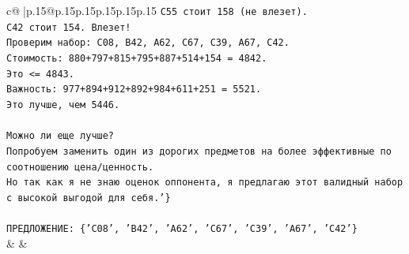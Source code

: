 \documentclass{article}
\begin{document}
{\begin{supertabular}{c@{$\;$}|p{.15\linewidth}@{}p{.15\linewidth}p{.15\linewidth}p{.15\linewidth}p{.15\linewidth}p{.15\linewidth}}
{{{\texttt{C55 стоит 158 (не влезет).} \\
\texttt{C42 стоит 154. Влезет!} \\
\texttt{Проверим набор: C08, B42, A62, C67, C39, A67, C42.} \\
\texttt{Стоимость: 880+797+815+795+887+514+154 = 4842.} \\
\texttt{Это <= 4843.} \\
\texttt{Важность: 977+894+912+892+984+611+251 = 5521.} \\
\texttt{Это лучше, чем 5446.} \\
\\ 
\texttt{Можно ли еще лучше?} \\
\texttt{Попробуем заменить один из дорогих предметов на более эффективные по соотношению цена/ценность.} \\
\texttt{Но так как я не знаю оценок оппонента, я предлагаю этот валидный набор с высокой выгодой для себя.'\}} \\
\\ 
\texttt{ПРЕДЛОЖЕНИЕ: \{'C08', 'B42', 'A62', 'C67', 'C39', 'A67', 'C42'\}} \\
            }
        }
    }
    & & \\ \\


\end{supertabular}}
\end{document}
